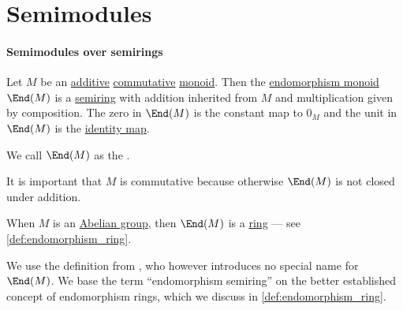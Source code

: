 \section{Semimodules}\label{sec:semimodules}

\paragraph{Semimodules over semirings}

\begin{definition}\label{def:endomorphism_semiring}
  Let \( M \) be an \hyperref[def:additive_semigroup]{additive} \hyperref[def:binary_operation/commutative]{commutative} \hyperref[def:monoid]{monoid}. Then the \hyperref[def:endomorphism_monoid]{endomorphism monoid} \( \End(M) \) is a \hyperref[def:semiring]{semiring} with addition inherited from \( M \) and multiplication given by composition. The zero in \( \End(M) \) is the constant map to \( 0_M \) and the unit in \( \End(M) \) is the \hyperref[def:set_valued_function/identity]{identity map}.

  We call \( \End(M) \) as the .
\end{definition}
\begin{comments}
  \item It is important that \( M \) is commutative because otherwise \( \End(M) \) is not closed under addition.

  \item When \( M \) is an \hyperref[def:abelian_group]{Abelian group}, then \( \End(M) \) is a \hyperref[def:ring]{ring} --- see \cref{def:endomorphism_ring}.

  \item We use the definition from \cite[example 1.14]{Golan1999Semirings}, who however introduces no special name for \( \End(M) \). We base the term \enquote{endomorphism semiring} on the better established concept of endomorphism rings, which we discuss in \cref{def:endomorphism_ring}.
\end{comments}
